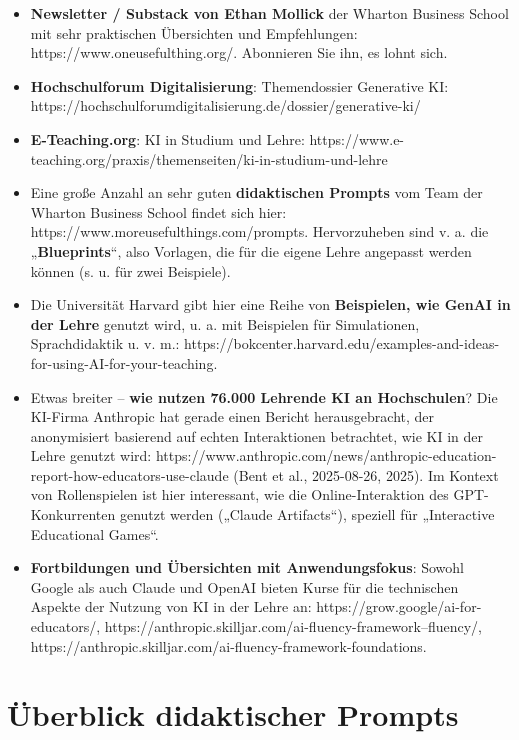 \documentclass[
  ngerman,
  letterpaper,
  DIV=11]{scrreprt}
\providecommand{\tightlist}{%
  \setlength{\itemsep}{0pt}\setlength{\parskip}{0pt}}
\begin{document}
\begin{itemize}
\tightlist
\item
  \textbf{Newsletter / Substack von Ethan Mollick} der Wharton Business
  School mit sehr praktischen Übersichten und Empfehlungen:
  https://www.oneusefulthing.org/. Abonnieren Sie ihn, es lohnt sich.
\item
  \textbf{Hochschulforum Digitalisierung}: Themendossier Generative KI:
  https://hochschulforumdigitalisierung.de/dossier/generative-ki/
\item
  \textbf{E-Teaching.org}: KI in Studium und Lehre:
  https://www.e-teaching.org/praxis/themenseiten/ki-in-studium-und-lehre
\item
  Eine große Anzahl an sehr guten \textbf{didaktischen Prompts} vom Team
  der Wharton Business School findet sich hier:
  https://www.moreusefulthings.com/prompts. Hervorzuheben sind v. a. die
  „\textbf{Blueprints}``, also Vorlagen, die für die eigene Lehre
  angepasst werden können (s. u. für zwei Beispiele).
\item
  Die Universität Harvard gibt hier eine Reihe von \textbf{Beispielen,
  wie GenAI in der Lehre} genutzt wird, u. a. mit Beispielen für
  Simulationen, Sprachdidaktik u. v. m.:
  https://bokcenter.harvard.edu/examples-and-ideas-for-using-AI-for-your-teaching.
\item
  Etwas breiter -- \textbf{wie nutzen 76.000 Lehrende KI an
  Hochschulen}? Die KI-Firma Anthropic hat gerade einen Bericht
  herausgebracht, der anonymisiert basierend auf echten Interaktionen
  betrachtet, wie KI in der Lehre genutzt wird:
  https://www.anthropic.com/news/anthropic-education-report-how-educators-use-claude
  (Bent et al., 2025-08-26, 2025). Im Kontext von Rollenspielen ist hier
  interessant, wie die Online-Interaktion des GPT-Konkurrenten genutzt
  werden („Claude Artifacts``), speziell für „Interactive Educational
  Games``.
\item
  \textbf{Fortbildungen und Übersichten mit Anwendungsfokus}: Sowohl
  Google als auch Claude und OpenAI bieten Kurse für die technischen
  Aspekte der Nutzung von KI in der Lehre an:
  https://grow.google/ai-for-educators/,
  https://anthropic.skilljar.com/ai-fluency-framework--fluency/,
  https://anthropic.skilljar.com/ai-fluency-framework-foundations.
\end{itemize}

\cleardoublepage
{}
{}
\appendix

\chapter{Überblick didaktischer Prompts}\label{sec-prompts-ueberblick}
\end{document}
